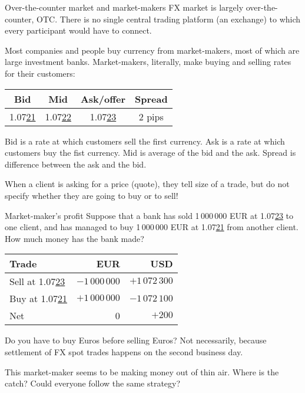 \documentclass{beamer}
\begin{document}
\begin{frame}{Over-the-counter market and market-makers}
\justify
FX market is largely \alert{over-the-counter, OTC}. There is no single central trading platform
(an exchange) to which every participant would have to connect.

\justify
Most companies and people buy currency from market-makers, most of which are large investment banks. \alert{Market-makers}, literally, make buying and selling rates for their customers:

\centering
\begin{tabular}{c|c|c|c}
Bid & Mid & Ask/offer & Spread \\ \hline
1.07\underline{21} & 1.07\underline{22} & 1.07\underline{23} & 2 pips
\end{tabular}

\justify
\alert{Bid} is a rate at which customers sell the first currency. \alert{Ask} is a rate at which customers buy the fist currency. \alert{Mid} is average of the bid and the ask. \alert{Spread} is difference between the ask and the bid.

\justify
When a client is asking for a price (quote), they tell size of a trade, but do not specify whether they are going to buy or to sell!
\end{frame}



\begin{frame}{Market-maker's profit}
\justify
Suppose that a bank has sold 1\,000\,000 EUR at 1.07\underline{23} to one client, and has managed to buy 1\,000\,000 EUR at 1.07\underline{21} from another client. How much money has the bank made?

\centering
\begin{tabular}{l|r|r}
Trade & EUR & USD \\
\hline
Sell at 1.07\underline{23} & $-1\,000\,000$ & $+1\,072\,300$ \\
Buy at 1.07\underline{21} & $+1\,000\,000$ & $-1\,072\,100$ \\
\hline
Net & 0 & $+200$
\end{tabular}

\justify
Do you have to buy Euros before selling Euros? Not necessarily, because settlement of FX
spot trades happens on the second business day.

\justify
This market-maker seems to be making money out of thin air. Where is the catch? Could everyone follow the same strategy?
\end{frame}
\end{document}
